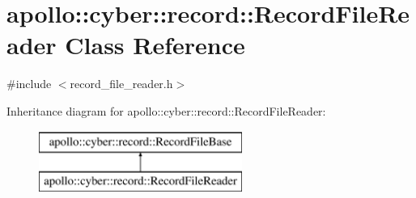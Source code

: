 \hypertarget{classapollo_1_1cyber_1_1record_1_1RecordFileReader}{\section{apollo\-:\-:cyber\-:\-:record\-:\-:Record\-File\-Reader Class Reference}
\label{classapollo_1_1cyber_1_1record_1_1RecordFileReader}
}


{\ttfamily \#include $<$record\-\_\-file\-\_\-reader.\-h$>$}

Inheritance diagram for apollo\-:\-:cyber\-:\-:record\-:\-:Record\-File\-Reader\-:\begin{figure}[H]
\begin{center}
\leavevmode
\includegraphics[height=2.000000cm]{classapollo_1_1cyber_1_1record_1_1RecordFileReader}
\end{center}
\end{figure}
